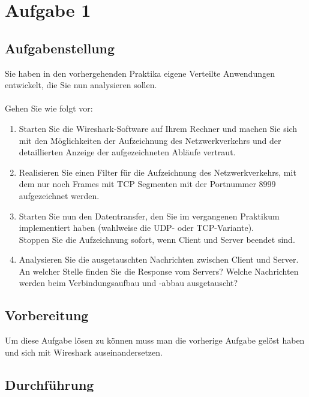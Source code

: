 \newpage
\section{Aufgabe 1}

\subsection{Aufgabenstellung}
Sie haben in den vorhergehenden Praktika eigene Verteilte Anwendungen entwickelt, die Sie nun analysieren sollen.\\\\Gehen Sie wie folgt vor:

\begin{enumerate}[label=(\alph*)]
	\item Starten Sie die Wireshark-Software auf Ihrem Rechner und machen Sie sich mit den Möglichkeiten der Aufzeichnung des Netzwerkverkehrs und der detaillierten Anzeige der aufgezeichneten Abläufe vertraut.
	\item Realisieren Sie einen Filter für die Aufzeichnung des Netzwerkverkehrs, mit dem nur noch Frames mit TCP Segmenten mit der Portnummer 8999 aufgezeichnet werden.
	\item Starten Sie nun den Datentransfer, den Sie im vergangenen Praktikum implementiert haben (wahlweise die UDP- oder TCP-Variante).\\Stoppen Sie die Aufzeichnung sofort, wenn Client und Server beendet sind.
	\item Analysieren Sie die ausgetauschten Nachrichten zwischen Client und Server. An welcher Stelle finden Sie die Response vom Servers? Welche Nachrichten werden beim Verbindungsaufbau und -abbau ausgetauscht?
\end{enumerate}

\subsection{Vorbereitung}
Um diese Aufgabe lösen zu können muss man die vorherige Aufgabe gelöst haben und sich mit Wireshark auseinandersetzen.

\subsection{Durchführung}

